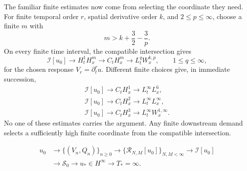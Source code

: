 The familiar finite estimates now come from selecting the coordinate they need.
For finite temporal order \(r\), spatial derivative order \(k\), and
\(2\le p\le\infty\), choose a finite \(m\) with
\[
m>k+\frac32-\frac3p.
\]
On every finite time interval, the compatible intersection gives
\[
\mathcal I[u_0]
\longrightarrow H_t^1H_x^m
\longrightarrow C_tH_x^m
\longrightarrow L_t^qW_x^{k,p},
\qquad 1\le q\le\infty,
\]
for the chosen response \(V_r=\partial_t^ru\). Different finite choices give,
in immediate succession,
\[
\begin{gathered}
\mathcal I[u_0]\longrightarrow C_tH_x^1
\longrightarrow L_t^\infty L_x^6,\\[2mm]
\mathcal I[u_0]\longrightarrow C_tH_x^2
\longrightarrow L_t^\infty L_x^\infty,\\[2mm]
\mathcal I[u_0]\longrightarrow C_tH_x^3
\longrightarrow L_t^\infty W_x^{1,\infty}.
\end{gathered}
\]
No one of these estimates carries the argument. Any finite downstream demand
selects a sufficiently high finite coordinate from the compatible
intersection.

\[
\begin{aligned}
u_0
&\longrightarrow \{(V_n,Q_n)\}_{n\ge0}
\longrightarrow \{\mathcal R_{N,M}[u_0]\}_{N,M<\infty}
\longrightarrow \mathcal I[u_0]\\
&\longrightarrow \mathscr S_0
\longrightarrow u_*\in H^\infty
\longrightarrow T_*=\infty .
\end{aligned}
\]
